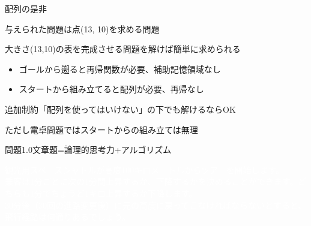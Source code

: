 \documentclass{beamer}
\begin{document}
\begin{frame}[fragile]{配列の是非}{}

与えられた問題は点(13, 10)を求める問題

大きさ(13,10)の表を完成させる問題を解けば簡単に求められる

\vfill
\begin{itemize}\itemsep8pt
\item ゴールから遡ると再帰関数が必要、補助記憶領域なし
\item スタートから組み立てると配列が必要、再帰なし
\end{itemize}

\vfill
追加制約「配列を使ってはいけない」の下でも解けるならOK

\vfill
{\fontsize{5}{5}\selectfont ただし電卓問題ではスタートからの組み立ては無理}
\end{frame}

\begin{frame}[fragile]{問題1.0}{文章題=論理的思考力+アルゴリズム}
\begin{spacing}{1.25}
\textcolor{white}{
観光用スペースシャトルが高度100キロメートルからツアーを開始します。\\
乗客は1分ごとに次の1分間上昇するか、下降するかを決めることができます。どちらも1分でちょうど1キロ上昇するか下降します。\\
30分後（30回の進路変更後）に元の高度に戻ってこなければならないとすると、飛行経路は何通りあるでしょう。
}
\end{spacing}
\end{frame}
\end{document}
